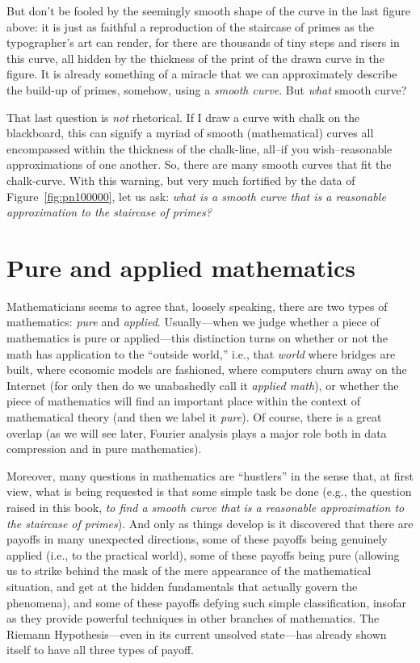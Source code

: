 \documentclass[openany]{book}
\theoremstyle{plain}
\theoremstyle{definition}
\newcommand{\RH}{Riemann Hypothesis\index{Riemann Hypothesis}}
\begin{document}
But don't be fooled by the seemingly smooth shape of the curve in the
last figure above: it is just as faithful a reproduction of the
staircase of primes as the typographer's art can render, for there are
thousands of tiny steps and risers in this curve, all hidden by the
thickness of the print of the drawn curve in the figure.  It is
already something of a miracle that we can approximately describe the
build-up of primes, somehow, using a {\em smooth curve}.  But {\em
  what} smooth curve?


That last question is {\em not} rhetorical. If I draw a curve with
chalk on the blackboard, this can signify a myriad of smooth
(mathematical) curves all encompassed within the thickness of the
chalk-line, all--if you wish--reasonable approximations of one
another. So, there are many smooth curves that fit the chalk-curve.
With this warning, but very much fortified by the data of Figure~\ref{fig:pn100000},
let us ask: {\em what is a smooth curve that is a reasonable
  approximation to the staircase of primes?}

\chapter{Pure and applied  mathematics}\label{ch:pureapplied}

Mathematicians seems to agree that, loosely speaking, there are two
types of mathematics: {\em pure} and {\em applied}. Usually---when we
judge whether a piece of mathematics is pure or applied---this
distinction turns on whether or not the math has application to the
``outside world,'' i.e., that {\em world} where bridges are built,
where economic models are fashioned, where computers churn away on the
Internet (for only then do we unabashedly call it {\em applied math}),
or whether the piece of mathematics will find an important place
within the context of mathematical theory (and then we label it {\em
  pure}).  Of course, there is a great overlap (as we will see later,
Fourier analysis plays a major role both in data compression and in
pure mathematics).

 Moreover, many questions in
mathematics are ``hustlers'' in the sense that, at first view, what is
being requested is that some simple task be done (e.g., the question
raised in this book, {\em to find a smooth curve that is a reasonable
  approximation to the staircase of primes}).  And only as things
develop is it discovered that there are payoffs in many unexpected
directions, some of these payoffs being genuinely applied (i.e., to
the practical world), some of these payoffs being pure (allowing us
to strike behind the mask of the mere appearance of the mathematical
situation, and get at the hidden fundamentals that actually govern the
phenomena), and some of these payoffs defying such simple
classification, insofar as they provide powerful techniques in other
branches of mathematics.  The \RH{}---even in its current
unsolved state---has already shown itself to have all three types of
payoff.
\end{document}
